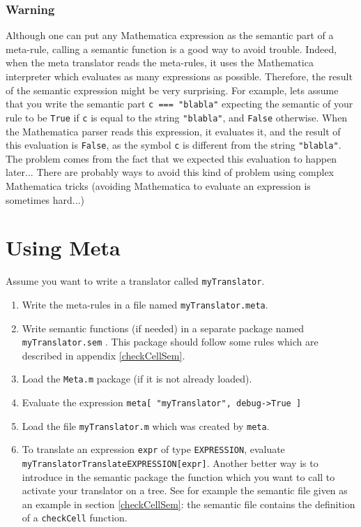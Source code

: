 \documentclass[12pt]{article}
\begin{document}
\subsubsection*{Warning}
Although one can put any Mathematica expression as the semantic part of
 a meta-rule, calling a semantic function is a good way to avoid trouble.
 Indeed, when the meta translator reads the meta-rules, it uses the Mathematica
 interpreter which evaluates as many expressions as possible.
 Therefore, the result of the semantic expression might be very surprising.
 For example, lets assume that you write the semantic part
\texttt{c === "blabla"}
expecting the semantic of your rule to be 
\texttt{True} if 
\texttt{c} is equal to the string 
\texttt{"blabla"}, and 
\texttt{False} otherwise.
When the Mathematica parser reads this expression, it evaluates it, and
 the result of this evaluation is 
\texttt{False}, as the symbol 
\texttt{c} is different from the string 
\texttt{"blabla"}. The problem comes from the fact that we expected this
evaluation to happen later...
There are probably ways to avoid this kind of problem using complex Mathematica tricks (avoiding
Mathematica to evaluate an expression is sometimes hard...)

\section{Using Meta}
\label{using}
Assume you want to write a translator called 
\texttt{myTranslator}.
\begin{enumerate}
\item Write the meta-rules in a file named 
\texttt{myTranslator.meta}.
\item Write semantic functions (if needed) in a separate package named 
\texttt{myTranslator.sem} .
 This package should follow some rules which are described in appendix
\ref{checkCellSem}.
\item Load the \texttt{Meta.m} package (if it is not already loaded).
\item Evaluate the expression
\newline 
\texttt{meta[ "myTranslator", debug->True ]}
\item 
Load the file 
\texttt{myTranslator.m} which was created by 
\texttt{meta}.
\item To translate an expression \texttt{expr} of type 
\texttt{EXPRESSION}, evaluate
\newline 
\texttt{myTranslatorTranslateEXPRESSION[expr]}. 
Another better way is to introduce in the semantic package the function
 which you want to call to activate your translator on a tree. 
 See for example the semantic file given as an example in section \ref{checkCellSem}: 
 the semantic file contains the definition of a \texttt{checkCell} function.
\end{enumerate}
\end{document}
